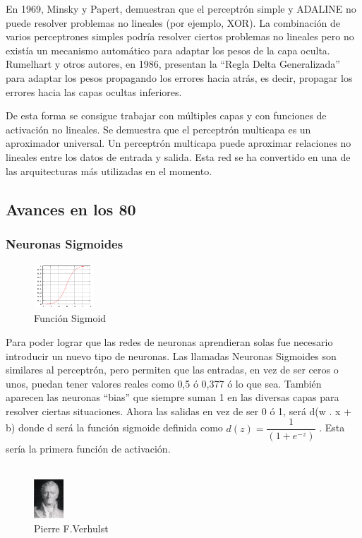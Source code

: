\documentclass[a4paper]{article}
\begin{document}
En 1969, Minsky y Papert, demuestran que el perceptrón simple y 
ADALINE no puede resolver problemas no lineales (por ejemplo, 
XOR). La combinación de varios perceptrones simples podría 
resolver ciertos problemas no lineales pero no existía un 
mecanismo automático para adaptar los pesos de la capa oculta. 
Rumelhart y otros autores, en 1986, presentan la ``Regla Delta 
Generalizada'' para adaptar los pesos propagando los errores hacia 
atrás, es decir, propagar los errores hacia las capas ocultas 
inferiores\cite{wikimultilayer}.


De esta forma se consigue trabajar con múltiples capas y con 
funciones de activación no lineales. Se demuestra que el 
perceptrón multicapa es un aproximador universal. Un perceptrón 
multicapa puede aproximar relaciones no lineales entre los datos 
de entrada y salida. Esta red se ha convertido en una de las 
arquitecturas más utilizadas en el momento.

\subsection{Avances en los 80}

\subsubsection{Neuronas Sigmoides}
\begin{figure} %
    \centering
    \includegraphics[width=0.2\textwidth]{./images/Logistic-curve.png}
    \caption{Función Sigmoid}
\end{figure}

Para poder lograr que las redes de neuronas aprendieran solas fue 
necesario introducir un nuevo tipo de neuronas. Las llamadas 
Neuronas Sigmoides son similares al perceptrón, pero permiten que 
las entradas, en vez de ser ceros o unos, puedan tener valores 
reales como 0,5 ó 0,377 ó lo que sea. También aparecen las 
neuronas ``bias'' que siempre suman 1 en las diversas capas para 
resolver ciertas situaciones. Ahora las salidas en vez de ser 0 ó 
1, será d(w . x + b) donde d será la función sigmoide definida 
como $d(z) = \dfrac{1}{( 1 +e^{-z})}$ . Esta sería la primera 
función de activación\cite{wikilogit}.
\\
\\
\begin{figure} %
    \centering
    \includegraphics[width=0.1\textwidth]{./images/Pierre_Francois.jpeg}
    \caption{Pierre F.Verhulst}
\end{figure}
\end{document}
